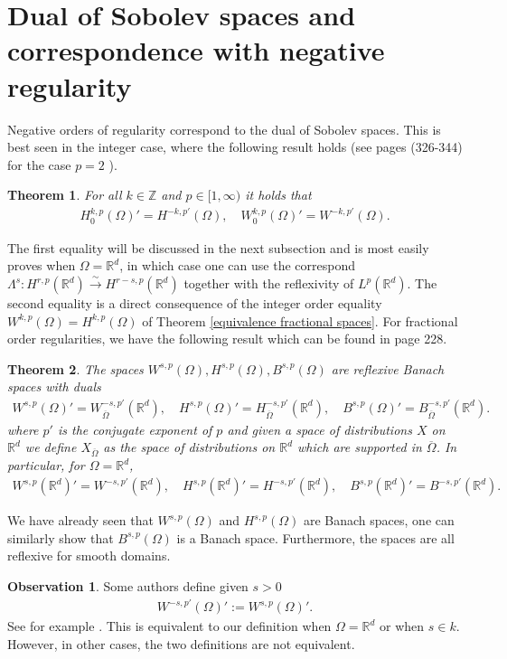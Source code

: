 \documentclass[
    a4paper,
    DIV=14,
    abstract=true,
    numbers=noenddot
]
{scrartcl}
\newtheorem{theorem}{Theorem}[section]
\theoremstyle{definition}
\newtheorem{observation}{Observation}
\newcommand{\iso}{\xrightarrow{\sim}}
\newcommand{\R}{\mathbb{R}}
\begin{document}
\section{Dual of Sobolev spaces and correspondence with negative regularity}
Negative orders of regularity correspond to the dual of Sobolev spaces. This is best seen in the integer case, where the following result holds (see \cite{evans2022partial} pages (326-344) for the case $p=2$ ).
\begin{theorem}\label{dual of integer sobolev}
    For all $k \in \mathbb{Z}$ and $p \in [1,\infty)$ it holds that
    \begin{align*}
        H^{k,p}_0(\Omega )' = H^{-k,p'}(\Omega ), \quad W^{k,p}_0(\Omega )' = W^{-k,p'}(\Omega ).
    \end{align*}
\end{theorem}
The first equality will be discussed in the next subsection and is most easily proves when $\Omega =\R^d$, in which case one can use the correspond $\Lambda ^s : H^{r,p}(\R^d )\iso H^{r-s,p}(\R^d )$ together with the reflexivity of $L^p(\R^d )$. The second equality is a direct consequence of the integer order equality $W^{k,p}(\Omega )=H^{k,p}(\Omega )$ of Theorem \ref{equivalence fractional spaces}. For fractional order regularities, we have the following result which can be found in \cite{agranovich2015sobolev} page 228.
\begin{theorem}
    The spaces $W^{s,p}(\Omega ),H^{s,p}(\Omega ),B^{s,p}(\Omega )$ are reflexive Banach spaces with duals
    \begin{align*}
        W^{s,p}(\Omega )'=	W^{-s,p'}_{\overline{\Omega } }(\R^d ), \quad H^{s,p}(\Omega )' = H^{-s,p'}_{\overline{\Omega } }(\R^d ), \quad B^{s,p}(\Omega )' = B^{-s,p'}_{\overline{\Omega } }(\R^d ).
    \end{align*}
    where $p'$ is the conjugate exponent of $p$ and given a space of distributions $X$ on $\R^d$ we define $X_{\overline{\Omega }}$ as the space of distributions on $\R^d$ which are supported in $\overline{\Omega }$. In particular, for $\Omega =\R^d$,
    \begin{align*}
        W^{s,p}(\R^d )'=	W^{-s,p'}(\R^d ), \quad H^{s,p}(\R^d )' = H^{-s,p'}(\R^d ), \quad B^{s,p}(\R^d )' = B^{-s,p'}(\R^d ).
    \end{align*}
\end{theorem}
We have already seen that $W^{s,p}(\Omega )$ and $H^{s,p}(\Omega )$ are Banach spaces, one can similarly show that $B^{s,p}(\Omega )$ is a Banach space. Furthermore, the spaces are all reflexive for smooth domains.
\begin{observation}
    Some authors define given $s>0$
    \begin{align*}
        W^{-s,p'}(\Omega )':=	W^{s,p}(\Omega )'.
    \end{align*}
    See for example \cite{biccari2018local}. This is equivalent to our definition when $\Omega = \R^d$ or when $s \in k$. However, in other cases, the two definitions are not equivalent.
\end{observation}
\end{document}
